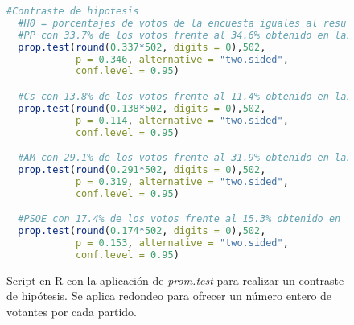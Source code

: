 \documentclass[11pt,a4paper]{article}
\begin{document}
\begin{figure}
\centering
\begin{lstlisting}[language=R]
  #Contraste de hipotesis
  #H0 = porcentajes de votos de la encuesta iguales al resultado electoral
  #PP con 33.7% de los votos frente al 34.6% obtenido en las elecciones
  prop.test(round(0.337*502, digits = 0),502,
            p = 0.346, alternative = "two.sided",
            conf.level = 0.95)

  #Cs con 13.8% de los votos frente al 11.4% obtenido en las elecciones
  prop.test(round(0.138*502, digits = 0),502,
            p = 0.114, alternative = "two.sided",
            conf.level = 0.95)

  #AM con 29.1% de los votos frente al 31.9% obtenido en las elecciones
  prop.test(round(0.291*502, digits = 0),502,
            p = 0.319, alternative = "two.sided",
            conf.level = 0.95)

  #PSOE con 17.4% de los votos frente al 15.3% obtenido en las elecciones
  prop.test(round(0.174*502, digits = 0),502,
            p = 0.153, alternative = "two.sided",
            conf.level = 0.95)
\end{lstlisting}
\caption{Script en R con la aplicación de \textit{prom.test} para realizar un contraste de hipótesis. Se aplica redondeo para ofrecer un número entero de votantes por cada partido.}
\label{fig:contraste}
\end{figure}
\end{document}
